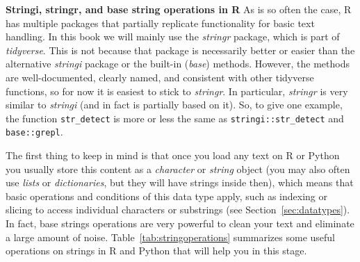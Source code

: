 \begin{feature}\textbf{Stringi, stringr, and base string operations in R}
  As is so often the case, R has multiple packages that partially replicate functionality for basic text handling.
  In this book we will mainly use the \emph{stringr} package, which is part of \emph{tidyverse}.
  This is not because that package is necessarily better or easier than the alternative \emph{stringi} package
  or the built-in (\emph{base}) methods.
  However, the methods are well-documented, clearly named, and consistent with other tidyverse functions,
  so for now it is easiest to stick to \emph{stringr}.
  In particular, \emph{stringr} is very similar to \emph{stringi} (and in fact is partially based on it).
  So, to give one example, the function \texttt{str\_detect} is more or less the same as \texttt{stringi::str\_detect} and \texttt{base::grepl}.
\end{feature}

The first thing to keep in mind is that once you load any text on R or Python you usually store this content as a \emph{character} or \emph{string} object (you may also often use \emph{lists} or \emph{dictionaries}, but they will have strings inside then), which means that basic operations and conditions of this data type apply, such as indexing or slicing to access individual characters or substrings (see Section~\ref{sec:datatypes}). In fact, base strings operations are very powerful to clean your text and eliminate a large amount of noise.  Table~\ref{tab:stringoperations} summarizes some useful operations on strings in R and Python that will help you in this stage.

